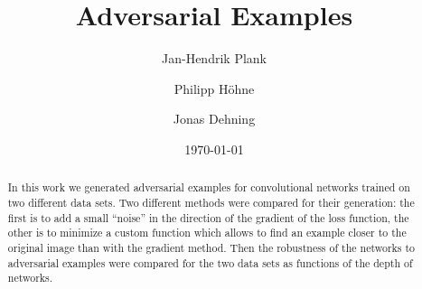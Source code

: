 \documentclass[%
 reprint,
 amsmath,amssymb,
 aps,
]{revtex4-1}
\begin{document}

\title{Adversarial Examples}%

\author{Jan-Hendrik Plank}
\author{Philipp Höhne}%
%


\author{Jonas Dehning}
%

\date{\today}%

\begin{abstract}
In this work we generated adversarial examples for convolutional networks trained on two different data sets. Two different methods were compared for their generation: the first is to add a small ``noise'' in the direction of the gradient of the loss function, the other is to minimize a custom function which allows to find an example closer to the original image than with the gradient method. Then the robustness of the networks to adversarial examples were compared for the two data sets as functions of the depth of networks.


\end{abstract}

\maketitle
\end{document}
